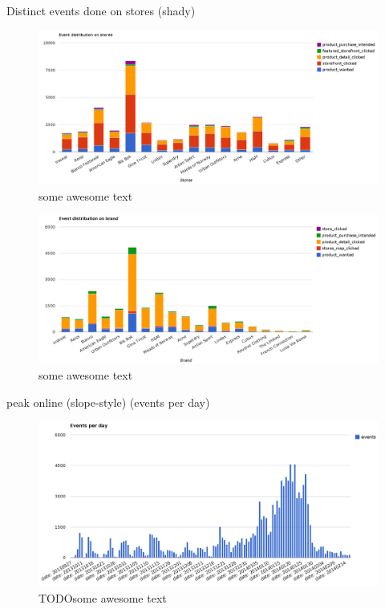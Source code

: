             Distinct events done on stores (shady)

    \begin{figure}[H]
        \includegraphics[width=5in]{image/event_distr.png}
        \centering
        \caption[Distribution of events on storefronts]{some awesome text}
    \end{figure}

    \begin{figure}[H]
        \includegraphics[width=5in]{image/brand_distr.png}
        \centering
        \caption[Distribution of events on brands]{some awesome text}
    \end{figure}

            peak online (slope-style) (events per day)

    \begin{figure}[H]
        \includegraphics[width=5in]{image/events_per_day.png}
        \centering
        \caption[Distribution of events per day]{TODOsome awesome text}
    \end{figure}


